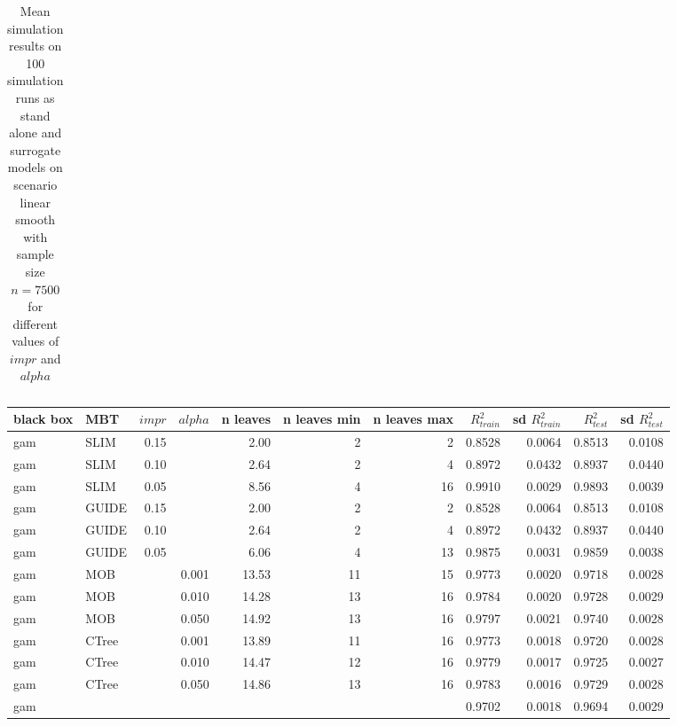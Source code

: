 \begin{table}[!htb]
\begin{tabular}[t]{l|l|r|r|r|r|r|r|r|r|r}
\hline
\end{tabular}
\caption{Mean simulation results on 100 simulation runs as stand alone and surrogate models on scenario linear smooth with sample size $n = 7500$ for different values of $impr$ and $alpha$}
\label{tab:app_linear_smooth_5000}

\end{table}



\begin{table}[!htb]

\centering \tiny
\begin{tabular}[t]{l|l|r|r|r|r|r|r|r|r|r}
\hline
black box & MBT & $impr$ & $alpha$ & n leaves & n leaves min & n leaves max &  $R^2_{train}$ & sd $R^2_{train}$ & $R^2_{test}$ & sd $R^2_{test}$\\
\hline
gam & SLIM & 0.15 & & 2.00 & 2 & 2 & 0.8528 & 0.0064 & 0.8513 & 0.0108\\
gam & SLIM & 0.10 & & 2.64 & 2 & 4 & 0.8972 & 0.0432 & 0.8937 & 0.0440\\
gam & SLIM & 0.05 & & 8.56 & 4 & 16 & 0.9910 & 0.0029 & 0.9893 & 0.0039\\
gam & GUIDE & 0.15 & & 2.00 & 2 & 2 & 0.8528 & 0.0064 & 0.8513 & 0.0108\\
gam & GUIDE & 0.10 & & 2.64 & 2 & 4 & 0.8972 & 0.0432 & 0.8937 & 0.0440\\
gam & GUIDE & 0.05 & & 6.06 & 4 & 13 & 0.9875 & 0.0031 & 0.9859 & 0.0038\\
gam & MOB & & 0.001 & 13.53 & 11 & 15 & 0.9773 & 0.0020 & 0.9718 & 0.0028\\
gam & MOB & & 0.010 & 14.28 & 13 & 16 & 0.9784 & 0.0020 & 0.9728 & 0.0029\\
gam & MOB & & 0.050 & 14.92 & 13 & 16 & 0.9797 & 0.0021 & 0.9740 & 0.0028\\
gam & CTree & & 0.001 & 13.89 & 11 & 16 & 0.9773 & 0.0018 & 0.9720 & 0.0028\\
gam & CTree & & 0.010 & 14.47 & 12 & 16 & 0.9779 & 0.0017 & 0.9725 & 0.0027\\
gam & CTree & & 0.050 & 14.86 & 13 & 16 & 0.9783 & 0.0016 & 0.9729 & 0.0028\\
\hline
gam & & & & & & & 0.9702 & 0.0018 & 0.9694 & 0.0029\\
\hline


\end{tabular}
\end{table}

